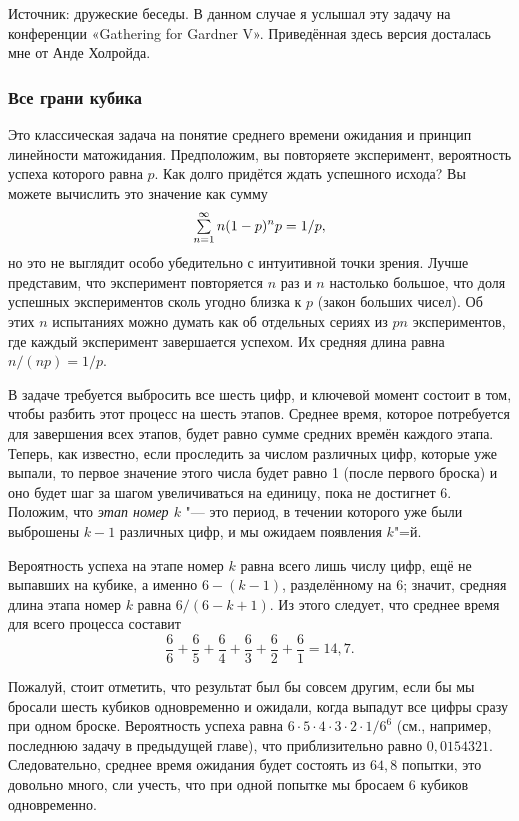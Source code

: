 \documentclass[twoside]{book}
\begin{document}
\medskip

{\small

Источник: дружеские беседы.
В данном случае я услышал эту задачу на конференции «Gathering for Gardner V».
Приведённая здесь версия досталась мне от Анде Холройда. %

}
\subsubsection*{Все грани кубика}%

Это классическая задача на понятие среднего времени ожидания и принцип линейности матожидания.
Предположим, вы повторяете эксперимент, вероятность успеха которого равна $p$.
Как долго придётся ждать успешного исхода? Вы можете вычислить это значение как сумму
\[\mathop{\textstyle\sum}\limits_{n=1}^\infty n(1-p)^np=1/p,\]
но это не выглядит особо убедительно с интуитивной точки зрения.
Лучше представим, что эксперимент повторяется $n$ раз и $n$ настолько большое, что доля успешных экспериментов сколь угодно близка к $p$ (закон больших чисел).
Об этих $n$ испытаниях можно думать как об отдельных сериях из $pn$ экспериментов, где каждый эксперимент завершается успехом.
Их средняя длина равна $n/(np)=1/p$.

В задаче требуется выбросить все шесть цифр, и ключевой момент состоит в том, чтобы разбить этот процесс на шесть этапов.
Среднее время, которое потребуется для завершения всех этапов, будет равно сумме средних времён каждого этапа.
Теперь, как известно, если проследить за числом различных цифр, которые уже выпали, то первое значение этого числа будет равно 1 (после первого броска) и оно будет шаг за шагом увеличиваться на единицу, пока не достигнет 6.
Положим, что \emph{этап номер $k$} "--- это период, в течении которого уже были выброшены $k-1$ различных цифр, и мы ожидаем появления $k$"=й.

Вероятность успеха на этапе номер $k$ равна всего лишь числу цифр, ещё не выпавших на кубике, а именно $6-(k-1)$, разделённому на $6$;
значит, средняя длина этапа номер $k$ равна $6/(6-k+1)$.
Из этого следует, что среднее время для всего процесса составит
\[\frac66+\frac65+\frac64+\frac63+\frac62+\frac61=14{,}7.\]
\heartf

Пожалуй, стоит отметить, что результат был бы совсем другим, если бы мы бросали шесть кубиков одновременно и ожидали, когда выпадут все цифры сразу при одном броске.
Вероятность успеха равна $6\cdot 5\cdot 4\cdot 3\cdot 2\cdot 1/6^6$ (см., например, последнюю задачу в предыдущей главе), что приблизительно равно $0{,}0154321$.
Следовательно, среднее время ожидания будет состоять из $64{,}8$ попытки, это довольно много, сли учесть, что при одной попытке мы бросаем 6 кубиков одновременно.
\end{document}
